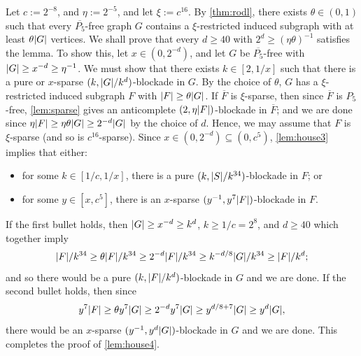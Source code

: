 \documentclass[11pt,reqno,a4paper]{amsart}
\let\oldendproof\endproof
\renewenvironment{proof}[1][\proofname]{%
	\oldproof[\normalfont\bfseries #1]%
}{\oldendproof}
\renewcommand{\subset}{\subseteq}
\DeclarePairedDelimiter\abs{\lvert}{\rvert}%
\begin{document}
	\begin{proof}
		Let $c:=2^{-8}$, and $\eta:=2^{-5}$, and let $\xi:=c^{16}$.
		By \cref{thm:rodl}, there exists $\theta\in(0,1)$ such that every $\overline{P_5}$-free graph $G$ contains a $\xi$-restricted induced subgraph with at least $\theta\abs G$ vertices.
		We shall prove that every $d\ge40$ with $2^{d}\ge(\eta\theta)^{-1}$ satisfies the lemma.
		To show this, let $x\in(0,2^{-d})$, and let $G$ be $\overline{P_5}$-free with $\abs G\ge x^{-d}\ge\eta^{-1}$.
		We must show that there exists $k\in[2,1/x]$ such that there is a pure or $x$-sparse $(k,\abs G/k^d)$-blockade in $G$.
		By the choice of $\theta$, $G$ has a $\xi$-restricted induced subgraph $F$ with $\abs F\ge\theta\abs G$.
		If $\overline F$ is $\xi$-sparse, then since $\overline F$ is $P_5$-free, \cref{lem:sparse} gives an anticomplete $(2,{\eta\abs F})$-blockade in $\overline F$;
		and we are done since ${\eta\abs F}\ge {\eta\theta\abs G}\ge {2^{-d}\abs G}$ by the choice of $d$.
		Hence, we may assume that $F$ is $\xi$-sparse (and so is $c^{16}$-sparse).
		Since $x\in(0,2^{-d})\subset(0,c^5)$, \cref{lem:house3} implies that either:
		\begin{itemize}
			\item for some $k\in[1/c,1/x]$, there is a pure $(k,\abs S/k^{34})$-blockade in $F$; or
			
			\item for some $y\in[x,c^5]$, there is an $x$-sparse $(y^{-1},{y^7\abs F})$-blockade in $F$.
		\end{itemize}
		
		If the first bullet holds, then $\abs G\ge x^{-d}\ge k^d$, $k\ge 1/c=2^8$, and $d\ge 40$ which together imply
		\[\abs F/k^{34}\ge \theta\abs F/k^{34}\ge 2^{-d}\abs F/k^{34}\ge k^{-d/8}\abs G/k^{34}
		\ge\abs F/k^d;\]
		and so there would be a pure $(k,\abs F/k^d)$-blockade in $G$ and we are done.
		If the second bullet holds, then since
		\[{y^7\abs F}\ge {\theta y^7\abs G}\ge {2^{-d}y^7\abs G}\ge {y^{d/8+7}\abs G}
		\ge {y^d\abs G},\]
		there would be an $x$-sparse $(y^{-1},y^d\abs G)$-blockade in $G$ and we are done.
		This completes the proof of \cref{lem:house4}.
	\end{proof}
\end{document}
